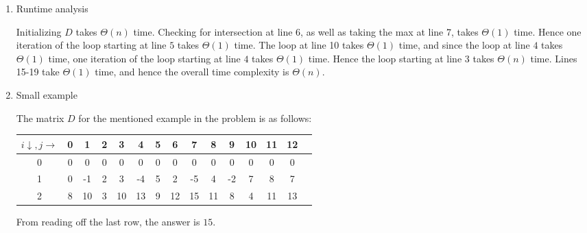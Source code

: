 \begin{enumerate}
\item Runtime analysis

    Initializing $D$ takes $\Theta(n)$ time. Checking for intersection at line 6, as well as taking the max at line 7, takes $\Theta(1)$ time. Hence one iteration of the loop starting at line $5$
    takes $\Theta(1)$ time. The loop at line 10 takes $\Theta(1)$ time, and since the loop at line $4$ takes $\Theta(1)$ time, one iteration of the loop starting at line $4$ takes $\Theta(1)$ time.
    Hence the loop starting at line $3$ takes $\Theta(n)$ time. Lines 15-19 take $\Theta(1)$ time, and hence the overall time complexity is $\Theta(n)$.

\item Small example

    The matrix $D$ for the mentioned example in the problem is as follows:
    \begin{center}
        \begin{tabular}{|c|c|c|c|c|c|c|c|c|c|c|c|c|c|c|}
            \hline
            $i \downarrow, j \rightarrow$ & 0 & 1 & 2 & 3 & 4 & 5 & 6 & 7 & 8 & 9 & 10 & 11 & 12 \\
            \hline
            0 & 0 & 0 & 0 & 0 & 0 & 0 & 0 & 0 & 0 & 0 & 0 & 0 & 0\\
            \hline
            1 & 0 & -1 & 2 & 3 & -4 & 5 & 2 & -5 & 4 & -2 & 7 & 8 & 7\\
            \hline
            2 & 8 & 10 & 3 & 10 & 13 & 9 & 12 & 15 & 11 & 8 & 4 & 11 & 13\\
            \hline
        \end{tabular}
    \end{center}

    From reading off the last row, the answer is $15$.

\end{enumerate}
